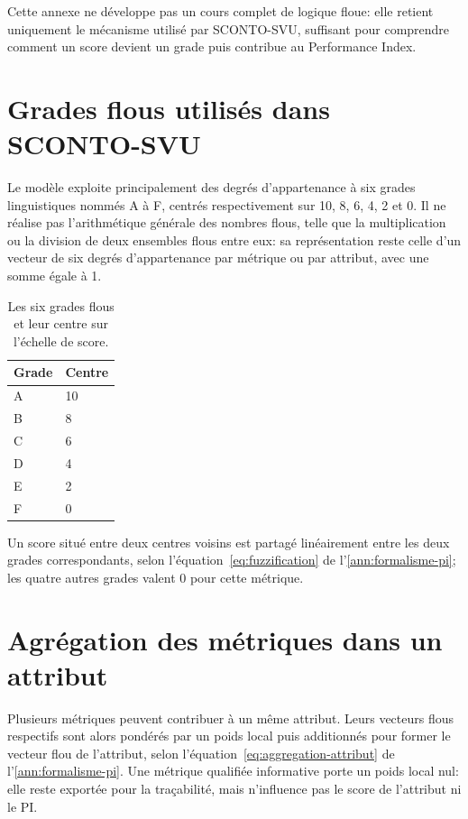 Cette annexe ne développe pas un cours complet de logique floue: elle retient uniquement le mécanisme utilisé par SCONTO-SVU, suffisant pour comprendre comment un score devient un grade puis contribue au Performance Index.

\section{Grades flous utilisés dans SCONTO-SVU}

Le modèle exploite principalement des degrés d'appartenance à six grades linguistiques nommés A à F, centrés respectivement sur 10, 8, 6, 4, 2 et 0. Il ne réalise pas l'arithmétique générale des nombres flous, telle que la multiplication ou la division de deux ensembles flous entre eux: sa représentation reste celle d'un vecteur de six degrés d'appartenance par métrique ou par attribut, avec une somme égale à 1.

\begin{table}[H]
  \centering
  \begin{tabularx}{0.6\textwidth}{L{0.15\textwidth} Y}
    \toprule
    Grade & Centre \\
    \midrule
    A & 10 \\
    B & 8 \\
    C & 6 \\
    D & 4 \\
    E & 2 \\
    F & 0 \\
    \bottomrule
  \end{tabularx}
  \caption{Les six grades flous et leur centre sur l'échelle de score.}
  \label{tab:grades-fuzzy}
\end{table}


Un score situé entre deux centres voisins est partagé linéairement entre les deux grades correspondants, selon l'équation~\ref{eq:fuzzification} de l'\cref{ann:formalisme-pi}; les quatre autres grades valent 0 pour cette métrique.

\section{Agrégation des métriques dans un attribut}

Plusieurs métriques peuvent contribuer à un même attribut. Leurs vecteurs flous respectifs sont alors pondérés par un poids local puis additionnés pour former le vecteur flou de l'attribut, selon l'équation~\ref{eq:aggregation-attribut} de l'\cref{ann:formalisme-pi}. Une métrique qualifiée informative porte un poids local nul: elle reste exportée pour la traçabilité, mais n'influence pas le score de l'attribut ni le PI.

